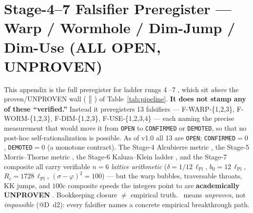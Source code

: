 \section{Stage-4--7 Falsifier Preregister --- Warp / Wormhole / Dim-Jump / Dim-Use (ALL OPEN, UNPROVEN)}
\label{app:stage47}

This appendix is the full preregister for ladder rungs
\textcircled{\scriptsize 4}--\textcircled{\scriptsize 7}, which sit
\emph{above} the proven/UNPROVEN wall ($\;\big\Vert\;$) of
Table~\ref{tab:pipeline}. \textbf{It does not stamp any of these
``verified.''} Instead it preregisters 13 falsifiers ---
F-WARP-\{1,2,3\}, F-WORM-\{1,2,3\}, F-DIM-\{1,2,3\}, F-USE-\{1,2,3,4\}
--- each naming the precise measurement that would move it from
\texttt{OPEN} to \texttt{CONFIRMED} or \texttt{DEMOTED}, so that no
post-hoc self-rationalization is possible. As of v1.0 all 13 are
\texttt{OPEN}; \texttt{CONFIRMED}$=0$, \texttt{DEMOTED}$=0$ (a monotone
contract). The Stage-4 Alcubierre metric \citep{alcubierre1994}, the
Stage-5 Morris--Thorne metric \citep{morristhorne1988}, the Stage-6
Kaluza--Klein ladder \citep{kaluza1921,klein1926}, and the Stage-7
composite all carry verifiable $n\!=\!6$ \emph{lattice arithmetic}
($\delta=1/12\,\ell_{\text{Pl}}$, $b_0=12\,\ell_{\text{Pl}}$,
$R_c=1728\,\ell_{\text{Pl}}$, $(\sigma\!-\!\varphi)^2=100$) --- but the
warp bubbles, traversable throats, KK jumps, and $100c$ composite speeds
the integers point to are \textbf{academically UNPROVEN}
\citep{pfenningford1997,fordroman1995,hawking1992}. Bookkeeping closure
$\ne$ empirical truth. \tierWhite\ means \emph{unproven}, not
\emph{impossible} (@D~d2): every falsifier names a concrete empirical
breakthrough path.

